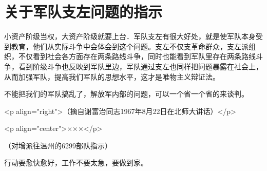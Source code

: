 \section[关于军队支左问题的指示（一九六七年八月）]{关于军队支左问题的指示}


小资产阶级当权，大资产阶级就要上台．军队支左有很大好处，就是使军队本身受到教育，他们从实际斗争中会体会到这个问题。支左不仅支革命群众，支左派组织，不仅看到社会各方面存在两条路线斗争，同时也能看到军队里存在两条路线斗争，看到阶级斗争也反映到军队里边，军队通过支左也同样把问题暴露在社会上，从而加强军队，提高我们军队的思想水平，这才是唯物主义辩证法。

不能把我们的军队搞乱了，解放军内部的问题，可以一个省一个省的来谈判。

<p align="right">（摘自谢富治同志1967年8月22日在北师大讲话）</p>

<p align="center">×××</p>

（对增派往温州的6299部队指示）

行动要愈快愈好，工作不要太急，要做到家。


